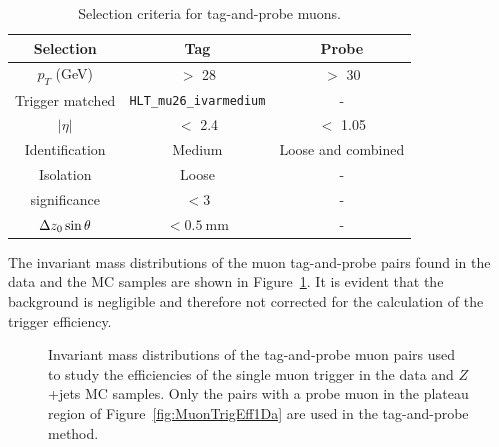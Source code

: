 \begin{table}[!htb]
	\centering
	\begin{tabular}{ccc}
		\hline
		\hline
		Selection           & Tag                               & Probe                     \\
		\hline
		$p_{T}$ (GeV)       & $>$ 28                            & $>$ 30                    \\
		Trigger matched     & \texttt{HLT\_mu26\_ivarmedium}    & -                         \\
		$|\eta|$            & $<$ 2.4                           & $<$ 1.05                  \\
		Identification      & Medium                            & Loose and combined        \\
		Isolation           & Loose                             & -                         \\
		\dzero significance & $< 3$                             & -                         \\
		$\Delta z_{0} \sin{\theta}$ & $< 0.5~\si{\mm}$         & -                         \\
		\hline
		\hline
	\end{tabular}
	\caption{Selection criteria for tag-and-probe muons.}
	\label{tab:ZmmSelection}
\end{table}

The invariant mass distributions of the muon tag-and-probe pairs found in the data and the MC samples are shown in Figure~\ref{fig:MuonTrigMass}. It is evident that the background is negligible and therefore not corrected for the calculation of the trigger efficiency.

\begin{figure}[!htb]
    \centering
    \caption{Invariant mass distributions of the tag-and-probe muon pairs used to study the efficiencies of the single muon trigger in the data and $Z$+jets MC samples. Only the pairs with a probe muon in the plateau region of Figure~\ref{fig:MuonTrigEff1Da} are used in the tag-and-probe method.
    }
    \label{fig:MuonTrigMass}
\end{figure}

